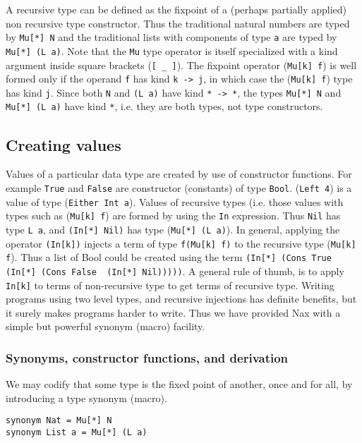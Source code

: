 \vspace*{0.1in}

A recursive type can be defined as the fixpoint of a (perhaps partially applied)
non recursive type constructor. Thus the traditional natural numbers are typed by \verb+Mu[*] N+
and the traditional lists with components of type \verb+a+ are typed by
\verb+Mu[*] (L a)+.  Note that the \verb+Mu+ type operator is itself specialized with a kind argument inside
square brackets (\verb+[ _ ]+). The fixpoint operator (\verb+Mu[k] f+) is well formed only
if the operand \verb+f+ has kind \verb+k -> j+, in which case the (\verb+Mu[k] f+) type
has kind \verb+j+. Since both \verb+N+ and \verb+(L a)+ have kind \verb+* -> *+,
the types  \verb+Mu[*] N+ and \verb+Mu[*] (L a)+ have kind \verb+*+, i.e. they 
are both types, not type constructors.

\subsection{Creating values}

Values of a particular data type are created by use of constructor functions. For
example \verb+True+ and \verb+False+ are constructor (constants) of type \verb+Bool+.
(\verb+Left 4+) is a value of type (\verb+Either Int a+). Values of recursive types
(i.e. those values with types such as (\verb+Mu[k] f+) are formed by using the \verb+In+
expression. Thus \verb+Nil+ has type \verb+L a+, and \verb+(In[*] Nil)+ has type
(\verb+Mu[*] (L a)+). In general, applying the operator \verb+(In[k])+ injects a term of
type \verb+f(Mu[k] f)+ to the recursive type (\verb+Mu[k] f+). Thus a list of Bool could be
created using the term \verb+(In[*] (Cons True  (In[*] (Cons False  (In[*] Nil)))))+. 
A general rule of thumb, is to apply \verb+In[k]+ to terms of non-recursive type
to get terms of recursive type. Writing programs using two level types, and recursive
injections has definite benefits, but it surely makes programs harder to write. Thus
we have provided Nax with a simple but powerful synonym (macro) facility.

\subsubsection{Synonyms, constructor functions, and derivation}\label{macro}

We may codify that some type is the fixed point of another, once and for all, by introducing
a type synonym (macro).

{\small
\begin{verbatim}
synonym Nat = Mu[*] N
synonym List a = Mu[*] (L a)     
\end{verbatim}}


